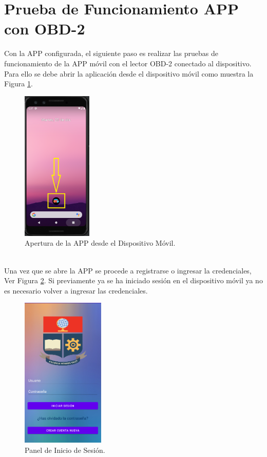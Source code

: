 \documentclass[a4paper,10pt, oneside, titlepage]{article}
\begin{document}
	\section{Prueba de Funcionamiento APP con OBD-2}\label{Prueba_Funcionamiento_OBD-2}
	Con la APP configurada, el siguiente paso es realizar las pruebas de funcionamiento de la APP móvil con el lector OBD-2 conectado al dispositivo. Para ello se debe abrir la aplicación desde el dispositivo móvil como muestra la Figura \ref{Apertura_App_OBD2}.
	\begin{figure}[!h]
		\centering
		\includegraphics[width = 0.45\linewidth, height = 7.2cm]{Apertura_App_OBD2.png}
		\caption{Apertura de la APP desde el Dispositivo Móvil.}
		\label{Apertura_App_OBD2}
	\end{figure} \\
	\indent Una vez que se abre la APP se procede a registrarse o ingresar la credenciales, Ver Figura \ref{Registro_Ingreso_Credenciales}. Si previamente ya se ha iniciado sesión en el dispositivo móvil ya no es necesario volver a ingresar las credenciales.
	\begin{figure}[!h]
		\centering
		\includegraphics[width = 0.45\linewidth, height = 7.2cm]{Registro_Ingreso_Credenciales.png}
		\caption{Panel de Inicio de Sesión.}
		\label{Registro_Ingreso_Credenciales}
	\end{figure} \\
\end{document}
